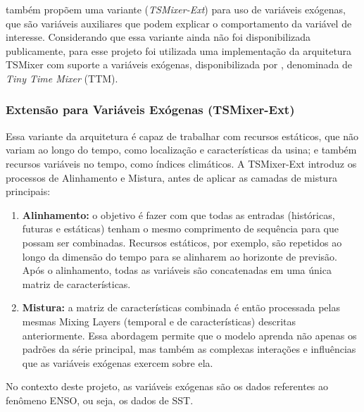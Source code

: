  também propõem uma variante (\textit{TSMixer-Ext}) para uso de variáveis exógenas, que são variáveis auxiliares que podem
explicar o comportamento da variável de interesse. Considerando que essa variante ainda não foi disponibilizada publicamente,
para esse projeto foi utilizada uma implementação da arquitetura TSMixer com suporte a variáveis exógenas,
disponibilizada por , denominada de \textit{Tiny Time Mixer} (TTM).

\subsubsection{Extensão para Variáveis Exógenas (TSMixer-Ext)}
Essa variante da arquitetura é capaz de trabalhar com recursos estáticos, que não variam ao longo do tempo, como
localização e características da usina; e também recursos variáveis no tempo, como índices climáticos. A TSMixer-Ext 
introduz os processos de Alinhamento e Mistura, antes de aplicar as camadas de mistura principais:

\begin{enumerate}
\item \textbf{Alinhamento:} o objetivo é fazer com que todas as entradas (históricas, futuras e estáticas) tenham o mesmo 
comprimento de sequência para que possam ser combinadas. Recursos estáticos, por exemplo, são repetidos ao longo da 
dimensão do tempo para se alinharem ao horizonte de previsão. Após o alinhamento, todas as variáveis são concatenadas 
em uma única matriz de características.
\item \textbf{Mistura:} a matriz de características combinada é então processada pelas mesmas Mixing Layers 
(temporal e de características) descritas anteriormente. Essa abordagem permite que o modelo aprenda não apenas os 
padrões da série principal, mas também as complexas interações e influências que as variáveis exógenas exercem sobre ela.
\end{enumerate}

No contexto deste projeto, as variáveis exógenas são os dados referentes ao fenômeno ENSO, ou seja, os dados de SST.